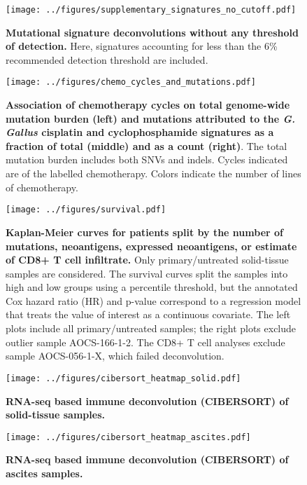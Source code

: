 \documentclass{article}
\begin{document}
\begin{figure}
\centering
\texttt{[image: ../figures/supplementary\_signatures\_no\_cutoff.pdf]}
\caption{\textbf{Mutational signature deconvolutions without any threshold of detection.} Here, signatures accounting for less than the 6\% recommended detection threshold are included.}
\label{fig:supplementary_signatures_no_cutoff}
\end{figure}




\begin{figure}
\centering
\texttt{[image: ../figures/chemo\_cycles\_and\_mutations.pdf]}
\caption{\textbf{Association of chemotherapy cycles on total genome-wide mutation burden (left) and mutations attributed to the \textit{G. Gallus} cisplatin and cyclophosphamide signatures as a fraction of total (middle) and as a count (right)}. The total mutation burden includes both SNVs and indels. Cycles indicated are of the labelled chemotherapy. Colors indicate the number of lines of chemotherapy.}
\label{fig:supp_chemo_cycles_and_mutations}
\end{figure}

\begin{figure}[htbp]
\centering
\texttt{[image: ../figures/survival.pdf]}
\caption{\textbf{Kaplan-Meier curves for patients split by the number of mutations, neoantigens, expressed neoantigens, or estimate of CD8+ T cell infiltrate.} Only primary/untreated solid-tissue samples are considered. The survival curves split the samples into high and low groups using a percentile threshold, but the annotated Cox hazard ratio (HR) and p-value correspond to a regression model that treats the value of interest as a continuous covariate. The left plots include all primary/untreated samples; the right plots exclude outlier sample AOCS-166-1-2. The CD8+ T cell analyses exclude sample AOCS-056-1-X, which failed deconvolution.}
\label{fig:survival}
\end{figure}

\begin{figure}[htbp]
\centering
\texttt{[image: ../figures/cibersort\_heatmap\_solid.pdf]}
\caption{\textbf{RNA-seq based immune deconvolution (CIBERSORT) of solid-tissue samples.}}
\label{fig:cibersortsolid}
\end{figure}

\begin{figure}[htbp]
\centering
\texttt{[image: ../figures/cibersort\_heatmap\_ascites.pdf]}
\caption{\textbf{RNA-seq based immune deconvolution (CIBERSORT) of ascites samples.}}
\label{fig:cibersortascites}
\end{figure}
\end{document}

